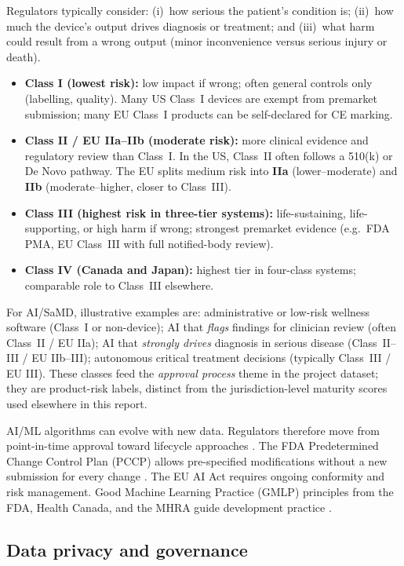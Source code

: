 \documentclass[12pt,a4paper]{report}
\begin{document}
Regulators typically consider: (i)~how serious the patient's condition is; (ii)~how much the device's output drives diagnosis or treatment; and (iii)~what harm could result from a wrong output (minor inconvenience versus serious injury or death).

\begin{itemize}
  \item \textbf{Class I (lowest risk):} low impact if wrong; often general controls only (labelling, quality). Many US Class~I devices are exempt from premarket submission; many EU Class~I products can be self-declared for CE marking.
  \item \textbf{Class II / EU IIa--IIb (moderate risk):} more clinical evidence and regulatory review than Class~I. In the US, Class~II often follows a 510(k) or De Novo pathway. The EU splits medium risk into \textbf{IIa} (lower--moderate) and \textbf{IIb} (moderate--higher, closer to Class~III).
  \item \textbf{Class III (highest risk in three-tier systems):} life-sustaining, life-supporting, or high harm if wrong; strongest premarket evidence (e.g.\ FDA PMA, EU Class~III with full notified-body review).
  \item \textbf{Class IV (Canada and Japan):} highest tier in four-class systems; comparable role to Class~III elsewhere.
\end{itemize}

For AI/SaMD, illustrative examples are: administrative or low-risk wellness software (Class~I or non-device); AI that \emph{flags} findings for clinician review (often Class~II / EU IIa); AI that \emph{strongly drives} diagnosis in serious disease (Class~II--III / EU IIb--III); autonomous critical treatment decisions (typically Class~III / EU III). These classes feed the \emph{approval process} theme in the project dataset; they are product-risk labels, distinct from the jurisdiction-level maturity scores used elsewhere in this report.

AI/ML algorithms can evolve with new data. Regulators therefore move from point-in-time approval toward lifecycle approaches \cite{babic2019,hwang2019}. The FDA Predetermined Change Control Plan (PCCP) allows pre-specified modifications without a new submission for every change \cite{fda2023}. The EU AI Act requires ongoing conformity and risk management. Good Machine Learning Practice (GMLP) principles from the FDA, Health Canada, and the MHRA guide development practice \cite{gmlp2021}.

\subsection{Data privacy and governance}
\end{document}

